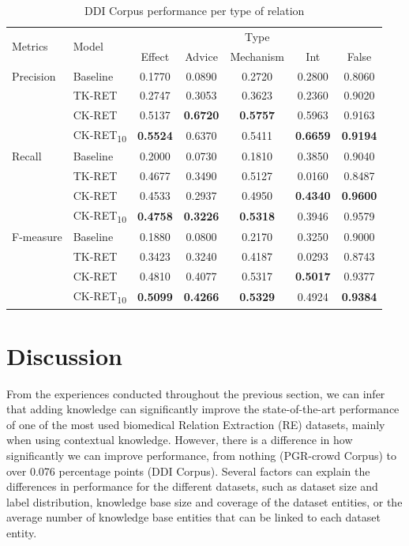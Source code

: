 \begin{table}[h]
\centering
\caption[DDI Corpus Performance per Type of Relation]{DDI Corpus performance per type of relation\label{Tab:05}} 
\begin{tabular}{@{}llccccc@{}}
\hline \multirow{2}{*}{Metrics} & \multirow{2}{*}{Model} &
\multicolumn{5}{c}{Type} \\\cline{3-7}
& & Effect & Advice & Mechanism & Int & False\\\hline
Precision & Baseline & 0.1770 & 0.0890 & 0.2720 & 0.2800 & 0.8060\\
& TK-RET & 0.2747 & 0.3053 & 0.3623 & 0.2360 & 0.9020 \\
& CK-RET & 0.5137 & \textbf{0.6720} & \textbf{0.5757} & 0.5963 & 0.9163 \\\cline{2-7}

& CK-RET\textsubscript{10} & \textbf{0.5524} & 0.6370 & 0.5411 & \textbf{0.6659} & \textbf{0.9194} \\
\hline
Recall & Baseline & 0.2000 & 0.0730 & 0.1810 & 0.3850 & 0.9040\\
& TK-RET & 0.4677 & 0.3490 & 0.5127 & 0.0160 & 0.8487 \\
& CK-RET & 0.4533 & 0.2937 & 0.4950 & \textbf{0.4340} & \textbf{0.9600} \\\cline{2-7}

& CK-RET\textsubscript{10} & \textbf{0.4758} & \textbf{0.3226} & \textbf{0.5318} & 0.3946 & 0.9579\\
\hline
F-measure & Baseline & 0.1880 & 0.0800 & 0.2170 & 0.3250 & 0.9000\\
& TK-RET & 0.3423 & 0.3240 & 0.4187 & 0.0293 & 0.8743 \\
& CK-RET & 0.4810 & 0.4077 & 0.5317 & \textbf{0.5017} & 0.9377 \\\cline{2-7}

& CK-RET\textsubscript{10} & \textbf{0.5099} & \textbf{0.4266} & \textbf{0.5329} & 0.4924 & \textbf{0.9384}\\
\hline
\end{tabular}
\end{table}


\section{Discussion}

From the experiences conducted throughout the previous section, we can infer that adding knowledge can significantly improve the state-of-the-art performance of one of the most used biomedical Relation Extraction (RE) datasets, mainly when using contextual knowledge. However, there is a difference in how significantly we can improve performance, from nothing (PGR-crowd Corpus) to over 0.076 percentage points (DDI Corpus). Several factors can explain the differences in performance for the different datasets, such as dataset size and label distribution, knowledge base size and coverage of the dataset entities, or the average number of knowledge base entities that can be linked to each dataset entity.

